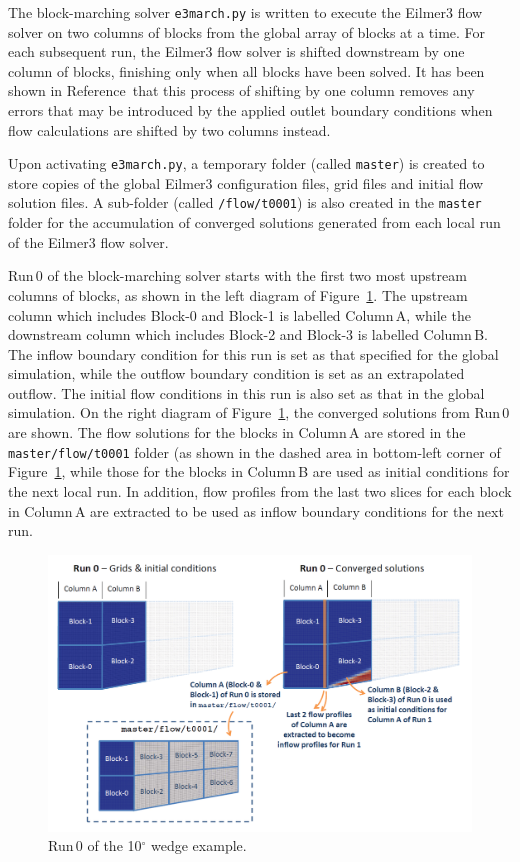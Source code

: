 \documentclass[12pt,a4paper,twoside]{article}
\begin{document}
\medskip
The block-marching solver \texttt{e3march.py} is written to execute the Eilmer3 flow solver 
on two columns of blocks from the global array of blocks at a time. For each subsequent run, 
the Eilmer3 flow solver is shifted downstream by one column of blocks, finishing only when 
all blocks have been solved. It has been shown in Reference\,\cite{zander_etal_2011b} that
this process of shifting by one column removes any errors that may be introduced by the 
applied outlet boundary conditions when flow calculations are shifted by two columns instead. 

\medskip
Upon activating \texttt{e3march.py}, a temporary folder (called \texttt{master}) is 
created to store copies of the global Eilmer3 configuration files, grid files and initial 
flow solution files. A sub-folder (called \texttt{/flow/t0001}) is also created in the 
\texttt{master} folder for the accumulation of converged solutions generated from each 
local run of the Eilmer3 flow solver. 

\medskip
Run\,0 of the block-marching solver starts with the first two most upstream columns of 
blocks, as shown in the left diagram of Figure~\ref{f:wedge10-run-0}. The upstream column 
which includes Block-0 and Block-1 is labelled Column\,A, while the downstream column 
which includes Block-2 and Block-3 is labelled Column\,B. The inflow boundary condition 
for this run is set as that specified for the global simulation, while the outflow 
boundary condition is set as an extrapolated outflow. The initial flow conditions in 
this run is also set as that in the global simulation. On the right diagram of 
Figure~\ref{f:wedge10-run-0}, the converged solutions from Run\,0 are shown. The flow
solutions for the blocks in Column\,A are stored in the \texttt{master/flow/t0001} 
folder (as shown in the dashed area in bottom-left corner of Figure~\ref{f:wedge10-run-0}, 
while those for the blocks in Column\,B are used as initial conditions for the next 
local run. In addition, flow profiles from the last two slices for each block in 
Column\,A are extracted to be used as inflow boundary conditions for the next run.
%
\begin{figure}[htbp]
   \centerline{ \includegraphics[width=15cm]{figs/e3march-run-0.png} }
   \caption{Run\,0 of the 10$^\circ$ wedge example.}
   \label{f:wedge10-run-0}
\end{figure}
\end{document}
